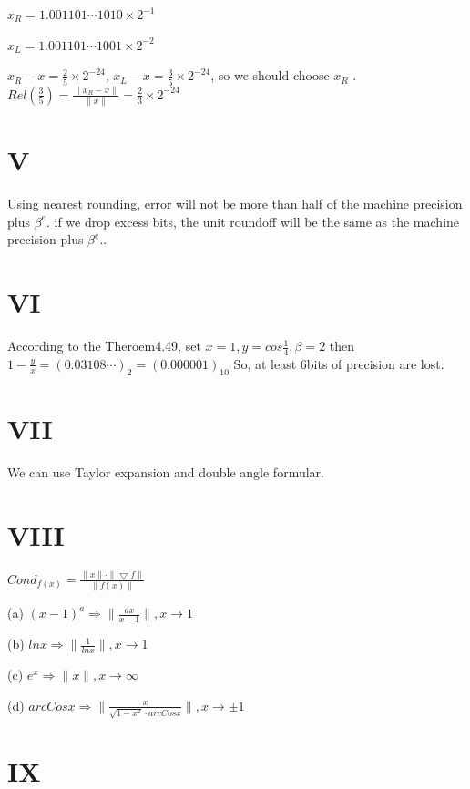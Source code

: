 \documentclass[a4paper]{article}
\begin{document}
$x_{R} = 1.001101\cdots 1010 \times 2^{-1}$

$x_{L} = 1.001101\cdots 1001 \times 2^{-2}$

$x_{R} - x = \frac{2}{5}\times 2^{-24}$, $x_{L} - x = \frac{3}{5}\times 2^{-24}$, 
so we should choose $x_{R}$ .$Rel(\frac{3}{5}) = \frac{\|x_{R} - x\|}{\|x\|} = \frac{2}{3}\times 2^{-24}$


\section*{V}

Using nearest rounding, error will not be more than half of the machine precision plus $\beta^{e}$. if we 
drop excess bits, the unit roundoff will be the same as the machine precision plus $\beta^{e}$..


\section*{VI}

According to the Theroem4.49, set $x = 1, y = cos\frac{1}{4}, \beta = 2$
then $1-\frac{y}{x} = (0.03108\cdots)_{2} = (0.000001)_{10}$
So, at least 6bits of precision are lost.


\section*{VII}

We can use Taylor expansion and double angle formular.


\section*{VIII}

$Cond_{f(x)} = \frac{\| x\| \cdot \| \bigtriangledown f\| }{\| f(x)\| }$

(a) $(x-1)^{a} \Rightarrow \| \frac{ax}{x-1} \| ,x\rightarrow 1$

(b) $lnx \Rightarrow \| \frac{1}{lnx} \| ,x\rightarrow 1$

(c) $e^{x} \Rightarrow \| x \| , x\rightarrow \infty $

(d) $arcCosx \Rightarrow \| \frac{x}{\sqrt{1-x^{2}}\cdot arcCosx } \| , x\rightarrow \pm 1 $



\section*{IX}
\end{document}
